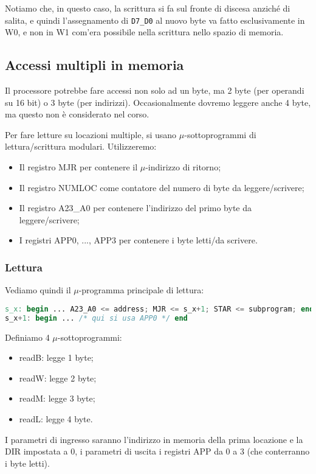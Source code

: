 \documentclass[a4paper,11pt]{article}
\begin{document}
Notiamo che, in questo caso, la scrittura si fa sul fronte di discesa anziché di salita, e quindi l'assegnamento di \lstinline|D7_D0| al nuovo byte va fatto esclusivamente in W0, e non in W1 com'era possibile nella scrittura nello spazio di memoria. 

\subsection{Accessi multipli in memoria}
Il processore potrebbe fare accessi non solo ad un byte, ma 2 byte (per operandi su 16 bit) o 3 byte (per indirizzi).
Occasionalmente dovremo leggere anche 4 byte, ma questo non è considerato nel corso.

Per fare letture su locazioni multiple, si usano $\mu$-sottoprogrammi di lettura/scrittura modulari.
Utilizzeremo:
\begin{itemize}
	\item Il registro MJR per contenere il $\mu$-indirizzo di ritorno;
	\item Il registro NUMLOC come contatore del numero di byte da leggere/scrivere;
	\item Il registro A23\_A0 per contenere l'indirizzo del primo byte da leggere/scrivere;
	\item I registri APP0, ..., APP3 per contenere i byte letti/da scrivere.
\end{itemize}

\subsubsection{Lettura}
Vediamo quindi il $\mu$-programma principale di lettura:
\begin{lstlisting}[language=verilog, style=codestyle]	
s_x: begin ... A23_A0 <= address; MJR <= s_x+1; STAR <= subprogram; end
s_x+1: begin ... /* qui si usa APP0 */ end
\end{lstlisting}

Definiamo 4 $\mu$-sottoprogrammi:
\begin{itemize}
	\item readB: legge 1 byte;
	\item readW: legge 2 byte;
	\item readM: legge 3 byte;
	\item readL: legge 4 byte.
\end{itemize}

I parametri di ingresso saranno l'indirizzo in memoria della prima locazione e la DIR impostata a 0, i parametri di uscita i registri APP da 0 a 3 (che conterranno i byte letti).
\end{document}
